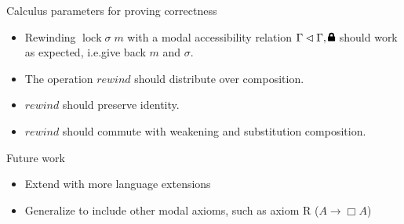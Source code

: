 \documentclass{beamer}
\newcommand{\lock}{\text{\tikz[baseline]{
      \fill[rounded corners=.1ex] (-.75ex,0) rectangle (.75ex,1ex);
      \draw[line width=.3ex] (-.4ex,.5ex) -- ++(0,.75ex) arc (180:0:.4ex) -- ++(0,-.75ex);
}}}
\begin{document}
\begin{frame}{Calculus parameters for proving correctness}
  \begin{itemize}
  \item Rewinding $\operatorname{lock} \sigma \; m$
    with a modal accessibility relation $\Gamma \lhd \Gamma, \lock$
    should work as expected, i.e.\@ give back $m$ and $\sigma$.
  \item The operation $\textit{rewind}$ should distribute over composition.
  \item $\textit{rewind}$ should preserve identity.
  \item $\textit{rewind}$ should commute with weakening and substitution composition.
  \end{itemize}
\end{frame}

\begin{frame}{Future work}
  \begin{itemize}
  \item Extend with more language extensions
  \item Generalize to include other modal axioms, such as axiom R ($A \to \Box A$)
  \end{itemize}
\end{frame}
\end{document}
